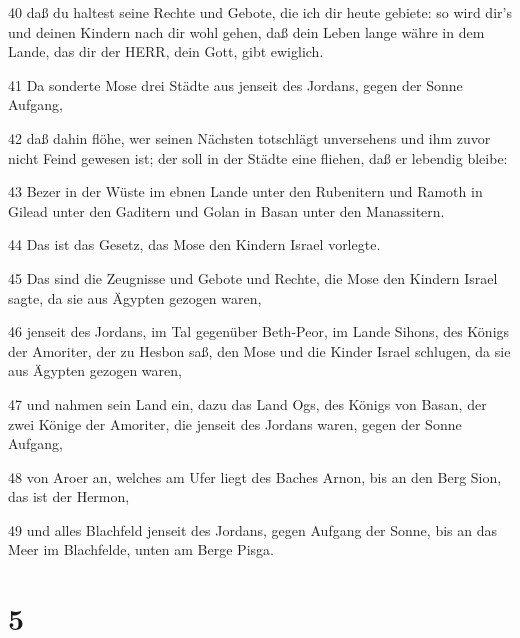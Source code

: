 \par 40 daß du haltest seine Rechte und Gebote, die ich dir heute gebiete: so wird dir's und deinen Kindern nach dir wohl gehen, daß dein Leben lange währe in dem Lande, das dir der HERR, dein Gott, gibt ewiglich.
\par 41 Da sonderte Mose drei Städte aus jenseit des Jordans, gegen der Sonne Aufgang,
\par 42 daß dahin flöhe, wer seinen Nächsten totschlägt unversehens und ihm zuvor nicht Feind gewesen ist; der soll in der Städte eine fliehen, daß er lebendig bleibe:
\par 43 Bezer in der Wüste im ebnen Lande unter den Rubenitern und Ramoth in Gilead unter den Gaditern und Golan in Basan unter den Manassitern.
\par 44 Das ist das Gesetz, das Mose den Kindern Israel vorlegte.
\par 45 Das sind die Zeugnisse und Gebote und Rechte, die Mose den Kindern Israel sagte, da sie aus Ägypten gezogen waren,
\par 46 jenseit des Jordans, im Tal gegenüber Beth-Peor, im Lande Sihons, des Königs der Amoriter, der zu Hesbon saß, den Mose und die Kinder Israel schlugen, da sie aus Ägypten gezogen waren,
\par 47 und nahmen sein Land ein, dazu das Land Ogs, des Königs von Basan, der zwei Könige der Amoriter, die jenseit des Jordans waren, gegen der Sonne Aufgang,
\par 48 von Aroer an, welches am Ufer liegt des Baches Arnon, bis an den Berg Sion, das ist der Hermon,
\par 49 und alles Blachfeld jenseit des Jordans, gegen Aufgang der Sonne, bis an das Meer im Blachfelde, unten am Berge Pisga.

\chapter{5}

